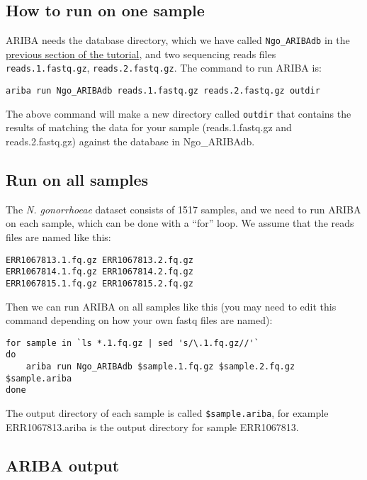 \documentclass[11pt]{article}
\begin{document}
    \hypertarget{how-to-run-on-one-sample}{%
\subsection{How to run on one sample}\label{how-to-run-on-one-sample}}

ARIBA needs the database directory, which we have called
\texttt{Ngo\_ARIBAdb} in the \href{make_custom_db.ipynb}{previous
section of the tutorial}, and two sequencing reads files
\texttt{reads.1.fastq.gz}, \texttt{reads.2.fastq.gz}. The command to run
ARIBA is:

\begin{verbatim}
ariba run Ngo_ARIBAdb reads.1.fastq.gz reads.2.fastq.gz outdir
\end{verbatim}

The above command will make a new directory called \texttt{outdir} that
contains the results of matching the data for your sample
(reads.1.fastq.gz and reads.2.fastq.gz) against the database in
Ngo\_ARIBAdb.

    \hypertarget{run-on-all-samples}{%
\subsection{Run on all samples}\label{run-on-all-samples}}

The \textit{N. gonorrhoeae} dataset consists of 1517 samples, and we need
to run ARIBA on each sample, which can be done with a ``for'' loop. We
assume that the reads files are named like this:

\begin{verbatim}
ERR1067813.1.fq.gz ERR1067813.2.fq.gz
ERR1067814.1.fq.gz ERR1067814.2.fq.gz
ERR1067815.1.fq.gz ERR1067815.2.fq.gz
\end{verbatim}

Then we can run ARIBA on all samples like this (you may need to edit
this command depending on how your own fastq files are named):

\begin{verbatim}
for sample in `ls *.1.fq.gz | sed 's/\.1.fq.gz//'`
do
    ariba run Ngo_ARIBAdb $sample.1.fq.gz $sample.2.fq.gz $sample.ariba
done
\end{verbatim}

The output directory of each sample is called \texttt{\$sample.ariba},
for example ERR1067813.ariba is the output directory for sample
ERR1067813.

    \hypertarget{ariba-output}{%
\subsection{ARIBA output}\label{ariba-output}}
\end{document}
